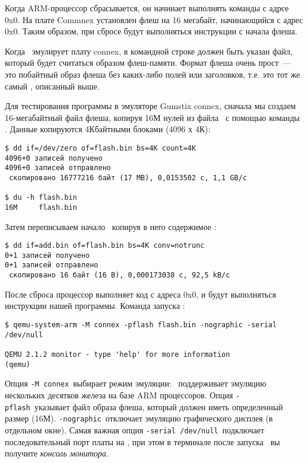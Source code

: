 
Когда ARM-процессор сбрасывается, он начинает выполнять команды с адрсе 0x0.
На плате Commnex установлен флеш на 16 мегабайт, начинающийся с адрес 0x0. Таким
образом, при сбросе будут выполняться инструкции с начала флеша.

Когда \qemu\ эмулирует плату connex, в командной строке должен быть указан файл,
который будет считаться образом флеш-памяти. Формат флеша очень прост\ --- это
побайтный образ флеша без каких-либо полей или заголовков, т.е. это тот же самый
, описанный выше.

Для тестирования программы в эмуляторе Gumstix connex, сначала мы создаем
16-мегабайтный файл флеша, копируя 16М нулей из файла \ с
помощью команды . Данные копируются 4Кбайтными блоками (4096 х 4К):

\begin{verbatim}
$ dd if=/dev/zero of=flash.bin bs=4K count=4K
4096+0 записей получено
4096+0 записей отправлено
 скопировано 16777216 байт (17 MB), 0,0153502 c, 1,1 GB/c

$ du -h flash.bin 
16M     flash.bin
\end{verbatim}

Затем переписываем начало \ копируя в него содержимое
:

\begin{verbatim}
$ dd if=add.bin of=flash.bin bs=4K conv=notrunc
0+1 записей получено
0+1 записей отправлено
 скопировано 16 байт (16 B), 0,000173038 c, 92,5 kB/c
\end{verbatim}

После сброса процессор выполняет код с адреса 0x0, и будут выполняться
инструкции нашей программы. Команда запуска \qemu:

\begin{verbatim}
$ qemu-system-arm -M connex -pflash flash.bin -nographic -serial /dev/null

QEMU 2.1.2 monitor - type 'help' for more information
(qemu) 
\end{verbatim}

Опция \verb|-M connex|\ выбирает режим эмуляции: \qemu\ поддерживает эмуляцию
нескольких десятков железа на базе ARM процессоров. Опция \verb|-pflash|\
указывает файл образа флеша, который должен иметь определенный размер (16М).
\verb|-nographic|\ отключает эмуляцию графического дисплея (в отдельном окне).
Самая важная опция \verb|-serial /dev/null|\ подключает последовательный порт
платы на \file{/dev/null}, при этом в терминале после запуска \qemu\ вы получите
\emph{консоль монитора}.


